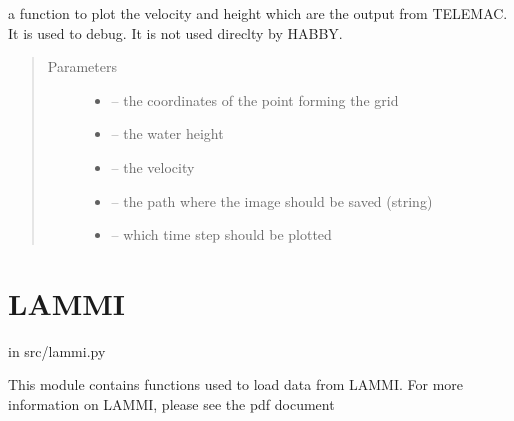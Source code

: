 \documentclass[letterpaper,10pt,english]{sphinxmanual}
\begin{document}

\begin{fulllineitems}
\label{\detokenize{index:src.selafin_habby1.plot_vel_h}}
a function to plot the velocity and height which are the output from TELEMAC. It is used to debug.
It is not used direclty by HABBY.
\begin{quote}\begin{description}
\item[{Parameters}] \leavevmode\begin{itemize}
\item {} 
 -- the coordinates of the point forming the grid

\item {} 
 -- the  water height

\item {} 
 -- the velocity

\item {} 
 -- the path where the image should be saved (string)

\item {} 
 -- which time step should be plotted

\end{itemize}

\end{description}\end{quote}

\end{fulllineitems}



\section{LAMMI}
\label{\detokenize{index:lammi}}
in src/lammi.py

This module contains functions used to load data from LAMMI. For more information on LAMMI, please see the pdf document 
\label{\detokenize{index:module-src.lammi}}
\end{document}
